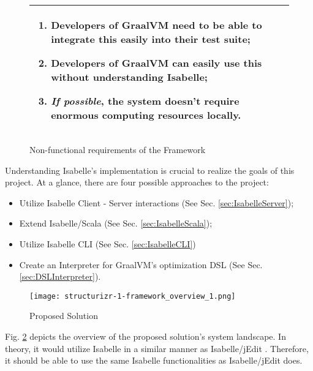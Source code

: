 \begin{figure}[h]
      \begin{tabular}{|L{0.95\textwidth}|}
            \hline
            \begin{enumerate}
                  \item Developers of GraalVM need to be able to integrate this easily into their test suite;
                  \item Developers of GraalVM can easily use this without understanding Isabelle;
                  \item \emph{If possible}, the system doesn't require enormous computing resources locally.
            \end{enumerate} \\
            \hline
      \end{tabular}
      \caption{Non-functional requirements of the Framework}
      \label{fig:requirements}
\end{figure}

Understanding Isabelle's implementation is crucial to realize the goals of this project. At a glance, there are four possible approaches 
to the project:

\begin{itemize}
    \item Utilize Isabelle Client - Server interactions (See Sec. \ref{sec:IsabelleServer});
    \item Extend Isabelle/Scala (See Sec. \ref{sec:IsabelleScala});
    \item Utilize Isabelle CLI (See Sec. \ref{sec:IsabelleCLI})
    \item Create an Interpreter for GraalVM's optimization DSL (See Sec. \ref{sec:DSLInterpreter}).
\end{itemize}

\begin{figure}[h]
      \centering
      \texttt{[image: structurizr-1-framework\_overview\_1.png]}
      \caption{Proposed Solution}
      \label{fig:SystemLandscape}
\end{figure}


Fig. \ref{fig:SystemLandscape} depicts the overview of the proposed solution's system landscape. In theory, it would utilize Isabelle in a similar 
manner as Isabelle/jEdit \cite{isabelleSystem}. Therefore, it should be able to use the same Isabelle functionalities as Isabelle/jEdit does.

